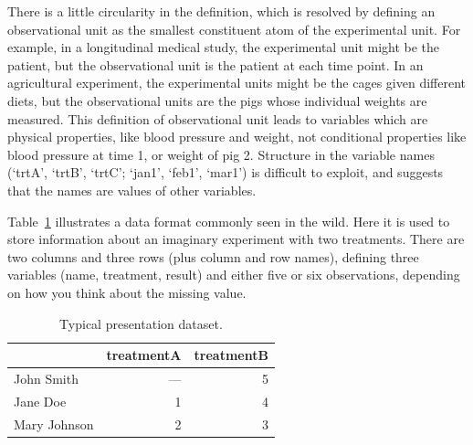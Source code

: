 \documentclass[article]{jss}
\begin{document}
There is a little circularity in the definition, which is resolved by defining an observational unit as the smallest constituent atom of the experimental unit. For example, in a longitudinal medical study, the experimental unit might be the patient, but the observational unit is the patient at each time point. In an agricultural experiment, the experimental units might be the cages given different diets, but the observational units are the pigs whose individual weights are measured. This definition of observational unit leads to variables which are physical properties, like blood pressure and weight, not conditional properties like blood pressure at time 1, or weight of pig 2. Structure in the variable names (`trtA', `trtB', `trtC'; `jan1', `feb1', `mar1') is difficult to exploit, and suggests that the names are values of other variables. 


Table~\ref{tbl:preg-raw} illustrates a data format commonly seen in the wild. Here it is used to store information about an imaginary experiment with two treatments. There are two columns and three rows (plus column and row names), defining three variables (name, treatment, result) and either five or six observations, depending on how you think about the missing value.

\begin{table}[htbp]
  \centering
  \begin{tabular}{lrr}
  \toprule
               & treatmentA & treatmentB \\
  \midrule
  John Smith   &      ---  &            5 \\
  Jane Doe     &        1  &            4 \\
  Mary Johnson &        2  &            3 \\
  \bottomrule
  \end{tabular}
  \caption{Typical presentation dataset.}
  \label{tbl:preg-raw}
\end{table}
\end{document}
